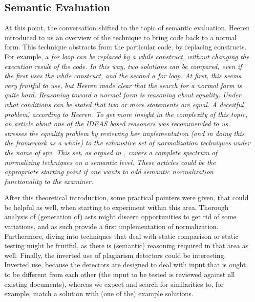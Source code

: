 \subsection{Semantic Evaluation} %
At this point, the conversation shifted to the topic of semantic evaluation.
Heeren introduced to us an overview of the technique to bring code back to a
normal form. This technique abstracts from the particular code, by replacing 
constructs. For example, a \em{for loop} can be replaced by a 
\em{while construct}, without 
changing the execution result of the code. In this way, two solutions can be
compared, even if the first uses the \em{while} construct, and the second a 
\em{for loop}. At first, this seems very fruitful to use, but Heeren made clear
that the search for a normal form is quite hard. Reasoning toward a normal form
is reasoning about equality. Under what conditions can be stated that two or 
more statements are equal. \"A deceitful problem\", according to Heeren. To 
get more insight in the complexity of this topic, an article about one of the
IDEAS based reasoners was recommended to us. \citep{keuning2014strategy} 
stresses the equality problem by reviewing her implementation (and in
doing this the framework as a whole) to the exhaustive set of normalization 
techniques under the name of \gls{spv}. This set, as argued in 
\citep{xu2003transformation}, covers a complete spectrum of normalizing 
techniques on a semantic level. These articles could be the appropriate 
starting point if one wants to add semantic normalization functionality 
to the \gls{examiner}.


After this theoretical introduction, some practical pointers were given, that
could be helpful as well, when starting to experiment within this area. 
Thorough analysis of (generation of) \glspl{ast} might discern opportunities 
to get rid of some variations, and as such provide a first implementation of
normalization. %
Furthermore, diving into techniques that deal with static comparison or static
testing might be fruitful, as there is (semantic) reasoning required in that
area as well. Finally, the inverted use of plagiarism detectors could be 
interesting. Inverted use, because the detectors are designed to deal with input 
that is ought to be different from each other (the input to be tested is 
reviewed against all existing documents), whereas we expect and search for 
similarities to, for example, match a solution with (one of the) example 
solutions. 


